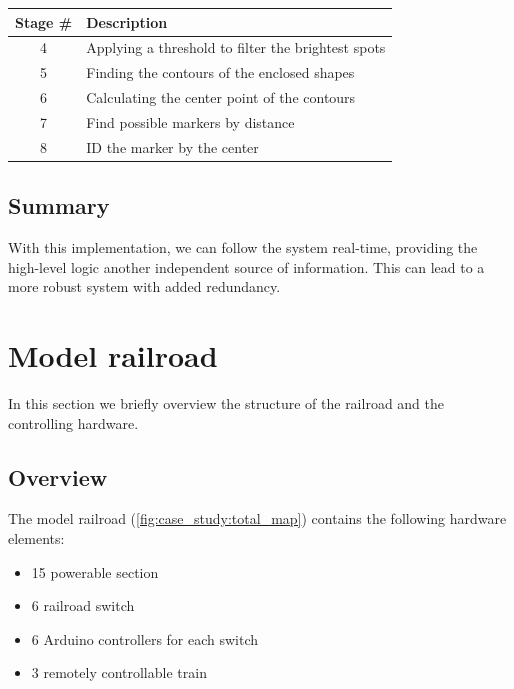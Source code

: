 \begin{table}[p]
\begin{tabularx}{\textwidth}{cm{5cm}X}
	\end{tabularx}
	\begin{tabularx}{\textwidth}{cX}
		\toprule
		Stage \# & Description  \\
		\midrule
		4 & Applying a threshold to filter the brightest spots \\
		5 & Finding the contours of the enclosed shapes \\
		6 & Calculating the center point of the contours \\
		7 & Find possible markers by distance \\
		8 & ID the marker by the center \\
		\bottomrule
	\end{tabularx}
\end{table}

\subsection{Summary}
With this implementation, we can follow the system real-time, providing the high-level logic another independent source of information. This can lead to a more robust system with added redundancy.

\newpage
\section{Model railroad}
In this section we briefly overview the structure of the railroad and the controlling hardware.

\subsection{Overview}

\noindent The model railroad (\cref{fig:case_study:total_map}) contains the following hardware elements:
\begin{itemize}
	\item 15 powerable section
	\item 6 railroad switch
	\item 6 Arduino controllers for each switch
	\item 3 remotely controllable train
\end{itemize}

